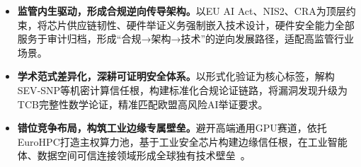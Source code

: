\begin{itemize}[tabitem]
\item \textbf{监管内生驱动，形成合规逆向传导架构。}以EU AI Act、NIS2、CRA为顶层约束，将芯片供应链韧性、硬件举证义务强制嵌入技术设计，硬件安全能力全部服务于审计归档，形成“合规→架构→技术”的逆向发展路径，适配高监管行业场景。
\item \textbf{学术范式差异化，深耕可证明安全体系。}以形式化验证为核心标签，解构SEV‑SNP等机密计算信任根，构建标准化合规论证链路，将漏洞发现升级为TCB完整性数学论证，精准匹配欧盟高风险AI举证要求。
\item \textbf{错位竞争布局，构筑工业边缘专属壁垒。}避开高端通用GPU赛道，依托EuroHPC打造主权算力池，基于工业安全芯片构建边缘信任根，在工业智能体、数据空间可信连接领域形成全球独有技术壁垒~\cite{eurohpcAIFactories2026}。
\end{itemize}


\begingroup


